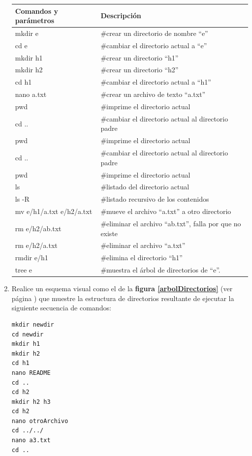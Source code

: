 \documentclass[12pt]{article}
\begin{document}
\begin{enumerate}[resume]
\begin{center}
    \begin{tabular}[t]{l l }
    \hline
        \textbf{Comandos y parámetros} & \textbf{Descripción} \\
    \hline
    \hline
        mkdir e &  \#crear un directorio de nombre ``e'' \\
        cd e &  \#cambiar el directorio actual a ``e'' \\
        mkdir h1 &  \#crear un directorio ``h1'' \\
        mkdir h2 &  \#crear un directorio ``h2'' \\
        cd h1 &  \#cambiar el directorio actual a ``h1'' \\
        nano a.txt &  \#crear un archivo de texto ``a.txt''\\
        pwd &  \#imprime el directorio actual\\
        cd .. &  \#cambiar el directorio actual al directorio padre \\
        pwd &  \#imprime el directorio actual \\
        cd .. &  \#cambiar el directorio actual al directorio padre \\
        pwd &  \#imprime el directorio actual \\
        ls &  \#listado del directorio actual \\
        ls -R &  \#listado recursivo de los contenidos \\
        mv e/h1/a.txt e/h2/a.txt &  \#mueve el archivo ``a.txt'' a otro directorio \\
        rm e/h2/ab.txt &  \#eliminar el archivo ``ab.txt'', falla por que no
        existe\\
        rm e/h2/a.txt &  \#eliminar el archivo ``a.txt'' \\
        rmdir e/h1 &  \#elimina el directorio ``h1'' \\
        tree e & \#muestra el árbol de directorios de ``e''.\\
    \hline
    \end{tabular}

\end{center}

    \item Realice un esquema visual como el de la \textbf{figura
        \ref{arbolDirectorios}} (ver página \pageref{arbolDirectorios}) que
        muestre la estructura de directorios resultante de ejecutar la
        siguiente secuencia de comandos:

        \begin{verbatim}
mkdir newdir
cd newdir
mkdir h1
mkdir h2
cd h1
nano README
cd ..
cd h2
mkdir h2 h3
cd h2
nano otroArchivo
cd ../../
nano a3.txt
cd ..
        \end{verbatim}


\end{enumerate}
\end{document}
